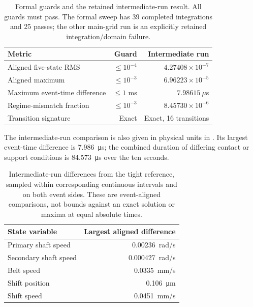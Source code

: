 \documentclass[11pt]{report}
\numberwithin{equation}{section}
\begin{document}
\begin{table}[H]
\centering\small
\begin{tabular}{@{}lrr@{}}
\toprule
Metric & Guard & Intermediate run \\
\midrule
Aligned five-state RMS & $\leq10^{-4}$ & $4.27408\times10^{-7}$ \\
Aligned maximum & $\leq10^{-3}$ & $6.96223\times10^{-5}$ \\
Maximum event-time difference & $\leq1$ ms & $7.98615~\mu$s \\
Regime-mismatch fraction & $\leq10^{-3}$ & $8.45730\times10^{-6}$ \\
Transition signature & Exact & Exact, 16 transitions \\
\bottomrule
\end{tabular}
\caption{Formal guards and the retained intermediate-run result. All guards
must pass. The formal sweep has 39 completed integrations and 25 passes;
the other main-grid run is an explicitly retained integration/domain failure.}
\label{tab:solver_convergence_guards}
\end{table}

The intermediate-run comparison is also given in physical units in
. Its largest event-time difference
is \SI{7.986}{\micro\second}; the combined duration of differing contact
or support conditions is \SI{84.573}{\micro\second} over the ten seconds.

\begin{table}[H]
  \centering\small
  \renewcommand{\arraystretch}{1.12}
  \begin{tabular}{@{}lr@{}}
    \toprule
    State variable & Largest aligned difference \\
    \midrule
    Primary shaft speed & \SI{0.00236}{rad/s} \\
    Secondary shaft speed & \SI{0.000427}{rad/s} \\
    Belt speed & \SI{0.0335}{mm/s} \\
    Shift position & \SI{0.106}{\micro\metre} \\
    Shift speed & \SI{0.0451}{mm/s} \\
    \bottomrule
  \end{tabular}
  \caption{Intermediate-run differences from the tight reference, sampled
  within corresponding continuous intervals and on both event sides.
  These are event-aligned comparisons, not bounds against an exact solution
  or maxima at equal absolute times.}
  \label{tab:solver_dimensional_results}
\end{table}
\end{document}
